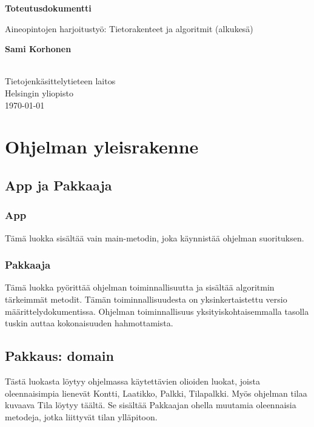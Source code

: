 \documentclass[a4paper,12pt, titlepage]{article}
\begin{document}
\begin{titlepage}
    \begin{center}
        \vspace*{1cm}
        
        \LARGE
        \textbf{Toteutusdokumentti}
        
        \vspace{0.5cm}
        \Large
        Aineopintojen harjoitustyö: Tietorakenteet ja algoritmit (alkukesä)
        
        \vspace{1.5cm}
        
        \large
        \textbf{Sami Korhonen} \\
         \\
        
		\vfill        
        \normalsize
        Tietojenkäsittelytieteen laitos\\
        Helsingin yliopisto\\
		\large        
        \today
        
    \end{center}
\end{titlepage}



\section*{Ohjelman yleisrakenne}
\subsection*{App ja Pakkaaja}
\subsubsection*{App}
Tämä luokka sisältää vain main-metodin, joka käynnistää ohjelman suorituksen.

\subsubsection*{Pakkaaja}
Tämä luokka pyörittää ohjelman toiminnallisuutta ja sisältää algoritmin tärkeimmät metodit. Tämän toiminnallisuudesta on yksinkertaistettu versio määrittelydokumentissa. Ohjelman toiminnallisuus yksityiskohtaisemmalla tasolla tuskin auttaa kokonaisuuden hahmottamista.
\subsection*{Pakkaus: domain}
Tästä luokasta löytyy ohjelmassa käytettävien olioiden luokat, joista oleennaisimpia lienevät Kontti, Laatikko, Palkki, Tilapalkki. Myös ohjelman tilaa kuvaava Tila löytyy täältä. Se sisältää Pakkaajan ohella muutamia oleennaisia metodeja, jotka liittyvät tilan ylläpitoon.
\end{document}
